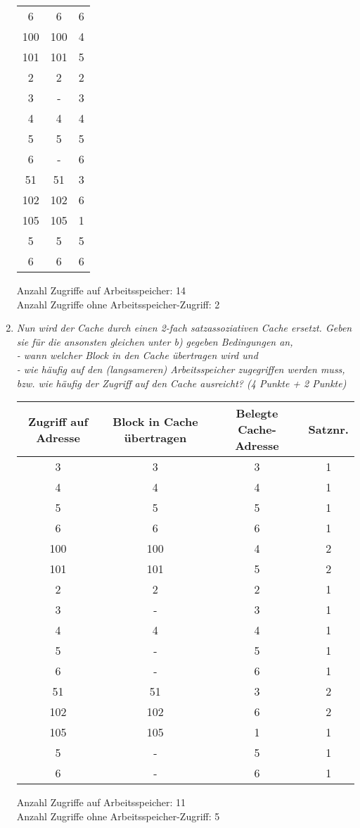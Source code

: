 \documentclass[10pt]{article}
\begin{document}
\begin{enumerate}[label=\alph*)]
\begin{tabular}{c | c | c}
		6	&	6 	& 6 \\
		100	&	100 & 4 \\
		101	&	101	& 5 \\
		2	&	2	& 2 \\
		3	&	-	& 3 \\
		4	&	4	& 4 \\
		5	&	5	& 5 \\
		6	&	-	& 6 \\
		51	&	51	& 3 \\
		102 &	102 & 6 \\
		105 &	105 & 1 \\
		5	&	5	& 5 \\
		6	&	6	& 6 \\
		\end{tabular}
		Anzahl Zugriffe auf Arbeitsspeicher: 14 \\
		Anzahl Zugriffe ohne Arbeitsspeicher-Zugriff: 2
	\item
		\textit{Nun wird der Cache durch einen 2-fach satzassoziativen Cache ersetzt. Geben sie für die ansonsten gleichen unter b) gegeben Bedingungen an, 	\\- wann welcher Block in den Cache übertragen wird und \\- wie häufig auf den (langsameren) Arbeitsspeicher zugegriffen werden muss, bzw. wie häufig der Zugriff auf den Cache ausreicht? (4 Punkte + 2 Punkte)}
		\begin{tabular}{c | c | c | c}
		Zugriff auf Adresse & Block in Cache übertragen & Belegte Cache-Adresse & Satznr.\\
		\hline
		3	& 	3 	& 3 	& 1\\
		4	&	4 	& 4 	& 1\\
		5	&	5 	& 5 	& 1\\
		6	&	6 	& 6 	& 1\\
		100	&	100 & 4 	& 2\\
		101	&	101	& 5 	& 2\\
		2	&	2	& 2 	& 1\\
		3	&	-	& 3 	& 1\\
		4	&	4	& 4 	& 1\\
		5	&	-	& 5 	& 1\\
		6	&	-	& 6 	& 1\\
		51	&	51	& 3 	& 2\\
		102 &	102 & 6 	& 2\\
		105 &	105 & 1 	& 1\\
		5	&	-	& 5 	& 1\\
		6	&	-	& 6 	& 1\\
		\end{tabular}
		Anzahl Zugriffe auf Arbeitsspeicher: 11 \\
		Anzahl Zugriffe ohne Arbeitsspeicher-Zugriff: 5
\end{enumerate}
\end{document}
